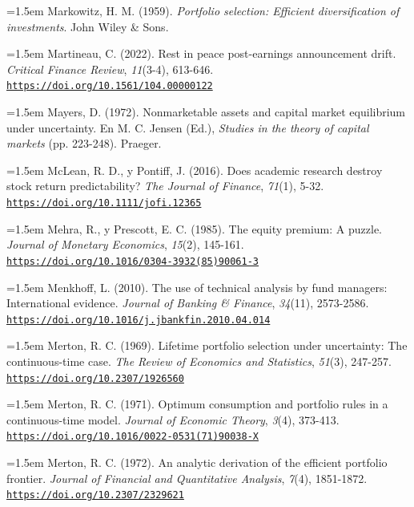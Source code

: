 \documentclass[10pt,a4paper]{article}
\begin{document}
\noindent\hangindent=1.5em Markowitz, H. M. (1959). \textit{Portfolio selection: Efficient diversification of investments}. John Wiley \& Sons.

\noindent\hangindent=1.5em Martineau, C. (2022). Rest in peace post-earnings announcement drift. \textit{Critical Finance Review}, \textit{11}(3-4), 613-646. \href{https://doi.org/10.1561/104.00000122}{\nolinkurl{https://doi.org/10.1561/104.00000122}}

\noindent\hangindent=1.5em Mayers, D. (1972). Nonmarketable assets and capital market equilibrium under uncertainty. En M. C. Jensen (Ed.), \textit{Studies in the theory of capital markets} (pp. 223-248). Praeger.

\noindent\hangindent=1.5em McLean, R. D., y Pontiff, J. (2016). Does academic research destroy stock return predictability? \textit{The Journal of Finance}, \textit{71}(1), 5-32. \href{https://doi.org/10.1111/jofi.12365}{\nolinkurl{https://doi.org/10.1111/jofi.12365}}

\noindent\hangindent=1.5em Mehra, R., y Prescott, E. C. (1985). The equity premium: A puzzle. \textit{Journal of Monetary Economics}, \textit{15}(2), 145-161. \href{https://doi.org/10.1016/0304-3932(85)90061-3}{\nolinkurl{https://doi.org/10.1016/0304-3932(85)90061-3}}

\noindent\hangindent=1.5em Menkhoff, L. (2010). The use of technical analysis by fund managers: International evidence. \textit{Journal of Banking \& Finance}, \textit{34}(11), 2573-2586. \href{https://doi.org/10.1016/j.jbankfin.2010.04.014}{\nolinkurl{https://doi.org/10.1016/j.jbankfin.2010.04.014}}

\noindent\hangindent=1.5em Merton, R. C. (1969). Lifetime portfolio selection under uncertainty: The continuous-time case. \textit{The Review of Economics and Statistics}, \textit{51}(3), 247-257. \href{https://doi.org/10.2307/1926560}{\nolinkurl{https://doi.org/10.2307/1926560}}

\noindent\hangindent=1.5em Merton, R. C. (1971). Optimum consumption and portfolio rules in a continuous-time model. \textit{Journal of Economic Theory}, \textit{3}(4), 373-413. \href{https://doi.org/10.1016/0022-0531(71)90038-X}{\nolinkurl{https://doi.org/10.1016/0022-0531(71)90038-X}}

\noindent\hangindent=1.5em Merton, R. C. (1972). An analytic derivation of the efficient portfolio frontier. \textit{Journal of Financial and Quantitative Analysis}, \textit{7}(4), 1851-1872. \href{https://doi.org/10.2307/2329621}{\nolinkurl{https://doi.org/10.2307/2329621}}
\end{document}
